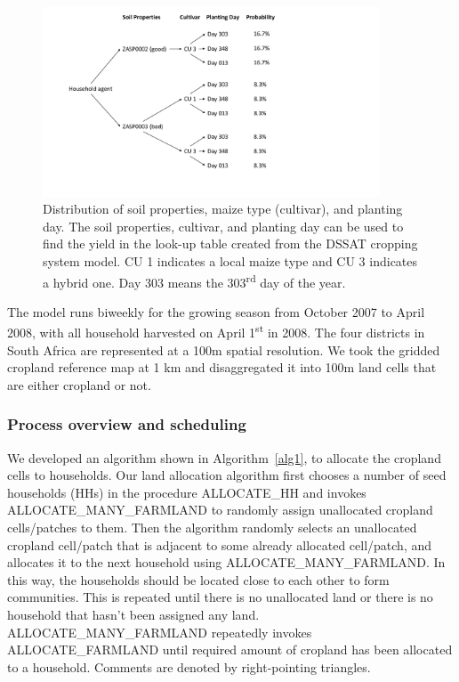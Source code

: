 \documentclass[12pt, titlepage]{article}
\begin{document}
\begin{figure}[!ht] 
\centering 
\includegraphics[width = 10cm]{figures/distribution.pdf} 
\caption{Distribution of soil properties, maize type (cultivar), and planting day. The soil properties, cultivar, and planting day can be used to find the yield in the look-up table created from the DSSAT cropping system model. CU 1 indicates a local maize type and CU 3 indicates a hybrid one. Day 303 means the 303\textsuperscript{rd} day of the year.} %
\label{fig:distribution} \end{figure}

The model runs biweekly for the growing season from October 2007 to April 2008, with all household harvested on April 1\textsuperscript{st} in 2008. The four districts in South Africa are represented at a 100m spatial resolution. We took the gridded cropland reference map at 1 km and disaggregated it into 100m land cells that are either cropland or not. %

\subsubsection{Process overview and scheduling}

We developed an algorithm shown in Algorithm~\ref{alg1}, to allocate the cropland cells to households.  Our land allocation algorithm first chooses a number of seed households (HHs) in the procedure \mbox{ALLOCATE\_HH} and invokes \mbox{ALLOCATE\_MANY\_FARMLAND} to randomly assign unallocated cropland cells/patches to them. Then the algorithm randomly selects an unallocated cropland cell/patch that is adjacent to some already allocated cell/patch, and allocates it to the next household using \mbox{ALLOCATE\_MANY\_FARMLAND}. In this way, the households should be located close to each other to form communities. This is repeated until there is no unallocated land or there is no household that hasn't been assigned any land. \mbox{ALLOCATE\_MANY\_FARMLAND} repeatedly invokes \mbox{ALLOCATE\_FARMLAND} until required amount of cropland has been allocated to a household. Comments are denoted by right-pointing triangles.
\end{document}
